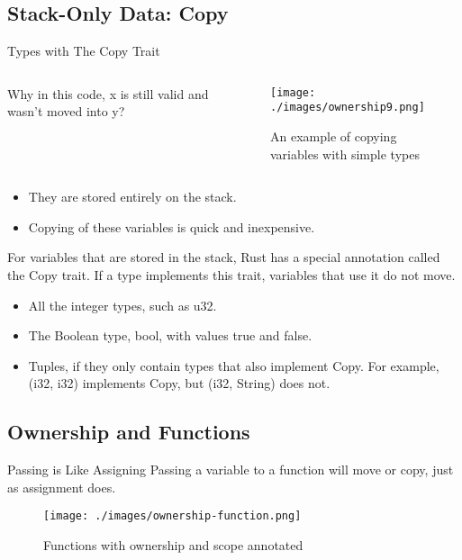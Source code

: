 \documentclass[10pt]{beamer}
\begin{document}
\subsection{Stack-Only Data: Copy}
\begin{frame}{Types with The Copy Trait}
    \begin{columns}
        \begin{column}{0.4\textwidth}
            Why in this code, x is still valid and wasn't moved into y?
        \end{column}
        \begin{column}{0.6\textwidth}
            \begin{figure}[htpb]
                \centering
                \texttt{[image: ./images/ownership9.png]}
                \caption{An example of copying variables with simple types\cite{rust-book}}
            \end{figure}
        \end{column}
    \end{columns}

    \begin{itemize}
        \item They are stored entirely on the stack.
        \item Copying of these variables is quick and inexpensive.
    \end{itemize}

    For variables that are stored in the stack, Rust has a special annotation called the Copy trait. If a type implements this trait, variables that use it do not move.

    \begin{itemize}
        \item All the integer types, such as u32.
        \item The Boolean type, bool, with values true and false.
        \item Tuples, if they only contain types that also implement Copy. For example, (i32, i32) implements Copy, but (i32, String) does not.
    \end{itemize}

\end{frame}

\subsection{Ownership and Functions}
\begin{frame}{Passing is Like Assigning}
    Passing a variable to a function will move or copy, just as assignment does.\cite{rust-book}

    \begin{figure}[htpb]
        \centering
        \texttt{[image: ./images/ownership-function.png]}
        \vspace*{-2mm}
        \caption{Functions with ownership and scope annotated\cite{rust-book}}
    \end{figure}
\end{frame}
\end{document}

